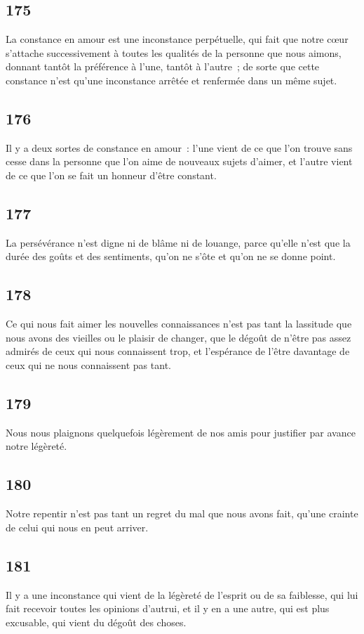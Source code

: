\documentclass[french,twoside]{book} %
\begin{document}
\subsection[{175}]{ \textsc{175} }
\noindent La constance en amour est une inconstance perpétuelle, qui fait que notre cœur s’attache successivement à toutes les qualités de la personne que nous aimons, donnant tantôt la préférence à l’une, tantôt à l’autre ; de sorte que cette constance n’est qu’une inconstance arrêtée et renfermée dans un même sujet.
\subsection[{176}]{ \textsc{176} }
\noindent Il y a deux sortes de constance en amour : l’une vient de ce que l’on trouve sans cesse dans la personne que l’on aime de nouveaux sujets d’aimer, et l’autre vient de ce que l’on se fait un honneur d’être constant.
\subsection[{177}]{ \textsc{177} }
\noindent La persévérance n’est digne ni de blâme ni de louange, parce qu’elle n’est que la durée des goûts et des sentiments, qu’on ne s’ôte et qu’on ne se donne point.
\subsection[{178}]{ \textsc{178} }
\noindent Ce qui nous fait aimer les nouvelles connaissances n’est pas tant la lassitude que nous avons des vieilles ou le plaisir de changer, que le dégoût de n’être pas assez admirés de ceux qui nous connaissent trop, et l’espérance de l’être davantage de ceux qui ne nous connaissent pas tant.
\subsection[{179}]{ \textsc{179} }
\noindent Nous nous plaignons quelquefois légèrement de nos amis pour justifier par avance notre légèreté.
\subsection[{180}]{ \textsc{180} }
\noindent Notre repentir n’est pas tant un regret du mal que nous avons fait, qu’une crainte de celui qui nous en peut arriver.
\subsection[{181}]{ \textsc{181} }
\noindent Il y a une inconstance qui vient de la légèreté de l’esprit ou de sa faiblesse, qui lui fait recevoir toutes les opinions d’autrui, et il y en a une autre, qui est plus excusable, qui vient du dégoût des choses.
\end{document}
